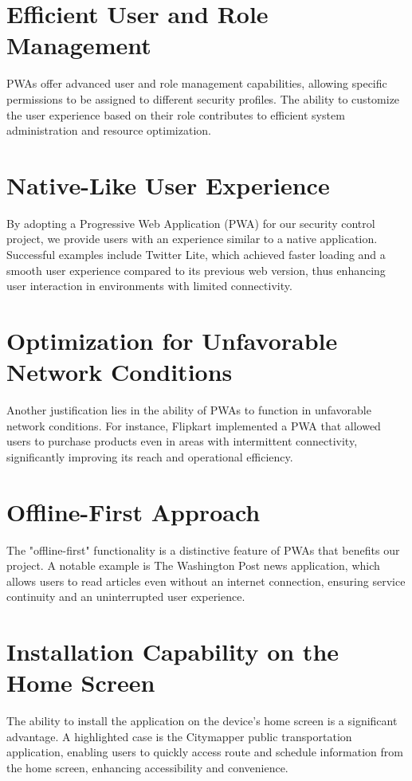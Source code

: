 \documentclass[journal]{IEEEtran}
\begin{document}
	\section*{Efficient User and Role Management}
	PWAs offer advanced user and role management capabilities, allowing specific permissions to be assigned to different security profiles. The ability to customize the user experience based on their role contributes to efficient system administration and resource optimization.
	
	\section*{Native-Like User Experience}
	By adopting a Progressive Web Application (PWA) for our security control project, we provide users with an experience similar to a native application. Successful examples include Twitter Lite, which achieved faster loading and a smooth user experience compared to its previous web version, thus enhancing user interaction in environments with limited connectivity.
	
	\section*{Optimization for Unfavorable Network Conditions}
	Another justification lies in the ability of PWAs to function in unfavorable network conditions. For instance, Flipkart implemented a PWA that allowed users to purchase products even in areas with intermittent connectivity, significantly improving its reach and operational efficiency.
	
	\section*{Offline-First Approach}
	The "offline-first" functionality is a distinctive feature of PWAs that benefits our project. A notable example is The Washington Post news application, which allows users to read articles even without an internet connection, ensuring service continuity and an uninterrupted user experience.
	
	\section*{Installation Capability on the Home Screen}
	The ability to install the application on the device's home screen is a significant advantage. A highlighted case is the Citymapper public transportation application, enabling users to quickly access route and schedule information from the home screen, enhancing accessibility and convenience.
	
\end{document}
